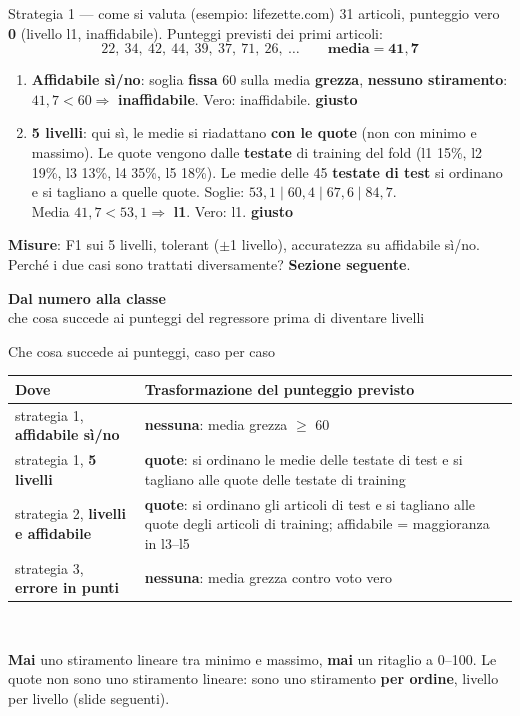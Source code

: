 \documentclass[aspectratio=169]{beamer}
\newcommand{\hl}[1]{\textbf{#1}}
\newcommand{\divider}[2]{%
  \begin{frame}[plain]
    \vfill
    \begin{center}
      {\color{dividerblue}\Huge\textbf{#1}}\\[0.8em]
      {\large #2}
    \end{center}
    \vfill
  \end{frame}}
\newcommand{\si}{\textcolor{verde}{\textbf{giusto}}}
\begin{document}
\begin{frame}{Strategia 1 --- come si valuta (esempio: lifezette.com)}
  \small
  31 articoli, punteggio vero \hl{0} (livello l1, inaffidabile). Punteggi previsti dei primi articoli:
  \[ 22,\ 34,\ 42,\ 44,\ 39,\ 37,\ 71,\ 26,\ \ldots \qquad \textbf{media} = \mathbf{41{,}7} \]
  \begin{enumerate}
    \setlength\itemsep{0.6em}
    \item \hl{Affidabile s\`i/no}: soglia \hl{fissa} 60 sulla media \hl{grezza}, \hl{nessuno stiramento}:
          $41{,}7 < 60 \Rightarrow$ \textbf{inaffidabile}. Vero: inaffidabile. \si
    \item \hl{5 livelli}: qui s\`i, le medie si riadattano \hl{con le quote} (non con minimo e massimo). Le quote vengono dalle
          \hl{testate} di training del fold (l1 15\%, l2 19\%, l3 13\%, l4 35\%, l5 18\%). Le medie delle 45 \hl{testate di test}
          si ordinano e si tagliano a quelle quote. Soglie: $53{,}1 \mid 60{,}4 \mid 67{,}6 \mid 84{,}7$.\\
          Media $41{,}7 <53{,}1 \Rightarrow$ \textbf{l1}. Vero: l1. \si
  \end{enumerate}
  \vspace{0.4em}
  \raggedright
  \hl{Misure}: F1 sui 5 livelli, tolerant ($\pm$1 livello), accuratezza su affidabile s\`i/no.\\
  Perch\'e i due casi sono trattati diversamente? \hl{Sezione seguente}.
\end{frame}

\divider{Dal numero alla classe}{che cosa succede ai punteggi del regressore prima di diventare livelli}

\begin{frame}{Che cosa succede ai punteggi, caso per caso}
  \vfill
  \centering\small
  \begin{tabular}{>{\raggedright\arraybackslash}p{}>{\raggedright\arraybackslash}p{}}
    \toprule
    \textbf{Dove} & \textbf{Trasformazione del punteggio previsto} \\
    \midrule
    strategia 1, \hl{affidabile s\`i/no} & \hl{nessuna}: media grezza $\ge$ 60 \\
    \addlinespace
    strategia 1, \hl{5 livelli} & \hl{quote}: si ordinano le medie delle testate di test e si tagliano alle quote delle testate
    di training \\
    \addlinespace
    strategia 2, \hl{livelli e affidabile} & \hl{quote}: si ordinano gli articoli di test e si tagliano alle quote degli articoli
    di training; affidabile = maggioranza in l3--l5 \\
    \addlinespace
    strategia 3, \hl{errore in punti} & \hl{nessuna}: media grezza contro voto vero \\
    \bottomrule
  \end{tabular}\\[1em]
  \raggedright
  \hl{Mai} uno stiramento lineare tra minimo e massimo, \hl{mai} un ritaglio a 0--100. Le quote non sono uno stiramento
  lineare: sono uno stiramento \hl{per ordine}, livello per livello (slide seguenti).
  \vfill
\end{frame}
\end{document}
